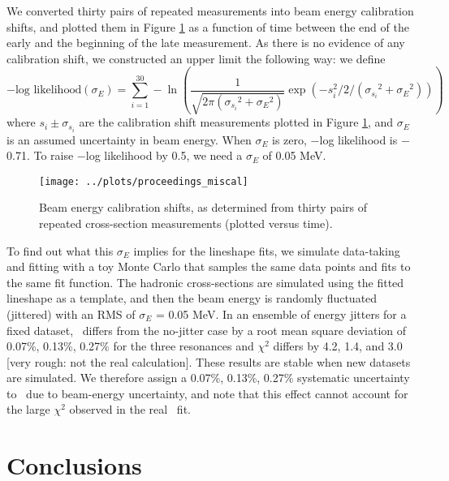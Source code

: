 \documentclass[aps,prd,preprint,superscriptaddress,tightenlines,nofootinbib,floatfix]{revtex4}
\begin{document}
We converted thirty pairs of repeated measurements into beam energy
calibration shifts, and plotted them in Figure \ref{fig:miscal} as a
function of time between the end of the early and the beginning of the
late measurement.  As there is no evidence of any calibration shift,
we constructed an upper limit the following way: we define
\begin{equation}
  -\mbox{log likelihood}(\sigma_E) = \sum_{i=1}^{30} -\ln \left(\frac{1}
  {\sqrt{2\pi ({\sigma_{s_i}}^2 + {\sigma_E}^2)}} \exp\left(
  -s_i^2 / 2 / ({\sigma_{s_i}}^2 + {\sigma_E}^2) \right) \right)
\end{equation}
where $s_i \pm \sigma_{s_i}$ are the calibration shift measurements
plotted in Figure \ref{fig:miscal}, and $\sigma_E$ is an assumed
uncertainty in beam energy.  When $\sigma_E$ is zero, $-$log
likelihood is $-$0.71.  To raise $-$log likelihood by 0.5, we need a
$\sigma_E$ of 0.05 MeV.

\begin{figure}[t]
  \begin{center}
    \texttt{[image: ../plots/proceedings\_miscal]}
  \end{center}
  \caption{\label{fig:miscal} Beam energy calibration shifts, as
    determined from thirty pairs of repeated cross-section
    measurements (plotted versus time).}
\end{figure}

To find out what this $\sigma_E$ implies for the lineshape fits, we
simulate data-taking and fitting with a toy Monte Carlo that samples
the same data points and fits to the same fit function.  The hadronic
cross-sections are simulated using the fitted lineshape as a template,
and then the beam energy is randomly fluctuated (jittered) with an RMS
of $\sigma_E$ = 0.05 MeV.  In an ensemble of energy jitters for a
fixed dataset, \gee\ differs from the no-jitter case by a root mean
square deviation of 0.07\%, 0.13\%, 0.27\% for the three resonances
and $\chi^2$ differs by 4.2, 1.4, and 3.0 [very rough: not the real
calculation].  These results are stable when new datasets are
simulated.  We therefore assign a 0.07\%, 0.13\%, 0.27\% systematic
uncertainty to \gee\ due to beam-energy uncertainty, and note that
this effect cannot account for the large $\chi^2$ observed in the real
\uone\ fit.

%
\section{Conclusions}
%
\end{document}
